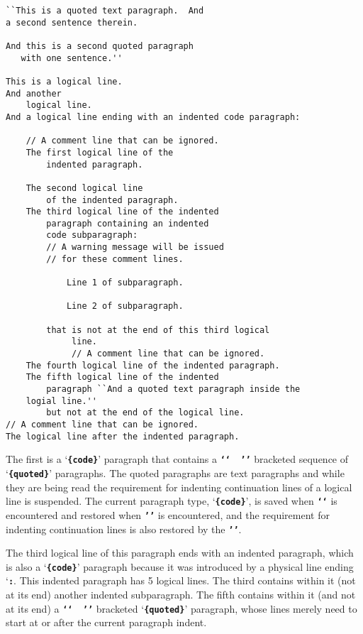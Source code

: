 \documentclass[12pt]{article}
\newcommand{\TT}[1]{{\tt \bfseries #1}}
\newenvironment{indpar}[1][0.3in]%
	{\begin{list}{}%
		     {\setlength{\itemsep}{0in}%
		      \setlength{\topsep}{0in}%
		      \setlength{\parsep}{1ex}%
		      \setlength{\labelwidth}{#1}%
		      \setlength{\leftmargin}{#1}%
		      \addtolength{\leftmargin}{\labelsep}}%
	 \item}%
	{\end{list}}
\begin{document}
\begin{indpar}\begin{verbatim}
``This is a quoted text paragraph.  And
a second sentence therein.

And this is a second quoted paragraph
   with one sentence.''

This is a logical line.
And another
    logical line.
And a logical line ending with an indented code paragraph:

    // A comment line that can be ignored.
    The first logical line of the
        indented paragraph.

    The second logical line
        of the indented paragraph.
    The third logical line of the indented
        paragraph containing an indented
        code subparagraph:
        // A warning message will be issued
        // for these comment lines.

            Line 1 of subparagraph.

            Line 2 of subparagraph.

        that is not at the end of this third logical
             line.
             // A comment line that can be ignored.
    The fourth logical line of the indented paragraph.
    The fifth logical line of the indented
        paragraph ``And a quoted text paragraph inside the
    logial line.''
        but not at the end of the logical line.
// A comment line that can be ignored.
The logical line after the indented paragraph.
\end{verbatim}\end{indpar}

The first is a `\TT{\{code\}}' paragraph that contains a \TT{`{}`~~'{}'}
bracketed sequence of `\TT{\{quoted\}}' paragraphs.  The quoted
paragraphs are text paragraphs and while they are being read the
requirement for indenting continuation lines of a logical
line is suspended.  The current paragraph type, `\TT{\{code\}}',
is saved when \TT{`{}`} is encountered and restored when
\TT{'{}'} is encountered, and the requirement for indenting
continuation lines is also restored by the \TT{'{}'}.

The third logical line of this paragraph ends with an indented paragraph,
which is also a `\TT{\{code\}}' paragraph because it was introduced by
a physical line ending `\TT{:}.
This indented paragraph has 5 logical lines.  The third
contains within it (not at its end) another indented subparagraph.
The fifth contains within it (and not at its end) a
\TT{`{}`~~'{}'} bracketed `\TT{\{quoted\}}' paragraph, whose lines
merely need to start at or after the current paragraph indent.
\end{document}
